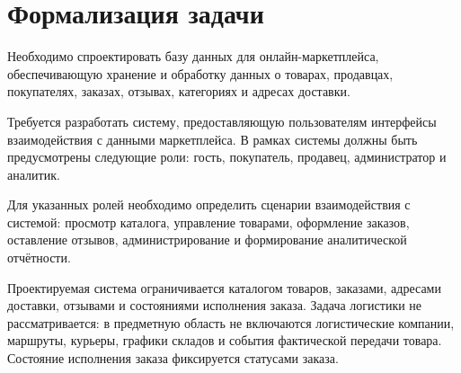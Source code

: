 
\section{Формализация задачи}

Необходимо спроектировать базу данных для онлайн-маркетплейса, обеспечивающую хранение и обработку данных о товарах, продавцах, покупателях, заказах, отзывах, категориях и адресах доставки.

Требуется разработать систему, предоставляющую пользователям интерфейсы взаимодействия с данными маркетплейса. В рамках системы должны быть предусмотрены следующие роли: гость, покупатель, продавец, администратор и аналитик.

Для указанных ролей необходимо определить сценарии взаимодействия с системой: просмотр каталога, управление товарами, оформление заказов, оставление отзывов, администрирование и формирование аналитической отчётности.

Проектируемая система ограничивается каталогом товаров, заказами, адресами доставки, отзывами и состояниями исполнения заказа. Задача логистики не рассматривается: в предметную область не включаются логистические компании, маршруты, курьеры, графики складов и события фактической передачи товара. Состояние исполнения заказа фиксируется статусами заказа.

\pagebreak
